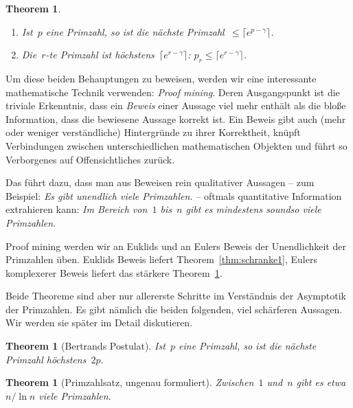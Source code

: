 \documentclass[twoside]{../zirkelblatt1415}
\theoremstyle{definition}
\theoremstyle{plain}
\newtheorem{thm}[defn]{Theorem}
\theoremstyle{remark}
\begin{document}
\begin{thm}\label{thm:schranke2}\ \\[-2em]
\begin{enumerate}
\item
Ist~$p$ eine Primzahl, so ist die nächste Primzahl~$\leq \lceil e^{p-\gamma}
\rceil$. \\[-2em]
\item
Die~$r$-te Primzahl ist höchstens~$\lceil e^{r-\gamma} \rceil$: $p_r
\leq \lceil e^{r-\gamma} \rceil$.
\end{enumerate}
\end{thm}

Um diese beiden Behauptungen zu beweisen, werden wir eine interessante
mathematische Technik verwenden: \emph{Proof mining}. Deren Ausgangspunkt ist
die triviale Erkenntnis, dass ein \emph{Beweis} einer Aussage viel mehr enthält
als die bloße Information, dass die bewiesene Aussage korrekt ist. Ein Beweis
gibt auch (mehr oder weniger verständliche) Hintergründe zu ihrer Korrektheit,
knüpft Verbindungen zwischen unterschiedlichen mathematischen Objekten und
führt so Verborgenes auf Offensichtliches zurück.

Das führt dazu, dass man aus Beweisen rein qualitativer Aussagen -- zum
Beispiel: \emph{Es gibt unendlich viele Primzahlen.} -- oftmals quantitative
Information extrahieren kann: \emph{Im Bereich von~$1$ bis~$n$ gibt es
mindestens soundso viele Primzahlen.}

Proof mining werden wir an Euklids und an Eulers Beweis der Unendlichkeit der
Primzahlen üben. Euklids Beweis liefert Theorem~\ref{thm:schranke1}, Eulers
komplexerer Beweis liefert das stärkere Theorem~\ref{thm:schranke2}.

Beide Theoreme sind aber nur allererste Schritte im Verständnis der Asymptotik
der Primzahlen. Es gibt nämlich die beiden folgenden, viel schärferen Aussagen.
Wir werden sie später im Detail diskutieren.

\begin{thm}[Bertrands Postulat]Ist~$p$ eine Primzahl, so ist die nächste
Primzahl höchstens~$2p$.
\end{thm}

\begin{thm}[Primzahlsatz, ungenau formuliert]Zwischen~$1$ und~$n$ gibt es
etwa~$n/\ln n$ viele Primzahlen.\end{thm}
\end{document}
